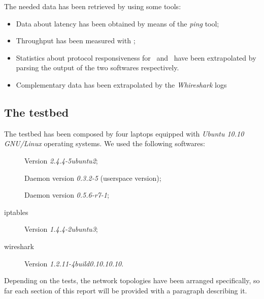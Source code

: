     The needed data has been retrieved by using some tools:
    \begin{itemize}
    \item   Data about latency has been obtained by means of the
            \emph{ping} tool;
    \item   Throughput has been measured with
            \netperf\cite{bib:NetPerf};
    \item   Statistics about protocol responsiveness for \batman\ and
            \olsr\ have been extrapolated by parsing the output of the
            two softwares respectively.
     \item Complementary data has been extrapolated by the
       \emph{Whireshark} logs
    \end{itemize}

\subsection{The testbed}
   The testbed has been composed by four laptops equipped with
    \emph{Ubuntu 10.10 GNU/Linux} operating systems. We used the following
    softwares:
    \begin{description}
    \item[\netperf] Version \emph{2.4.4-5ubuntu2};
    \item[\batman] Daemon version \emph{0.3.2-5} (userspace version);
    \item[\olsr] Daemon version \emph{0.5.6-r7-1};
    \item[iptables] Version \emph{1.4.4-2ubuntu3};
    \item[wireshark] Version \emph{1.2.11-4build0.10.10.10}.
    \end{description}

    Depending on the tests, the network topologies have been arranged
    specifically, so far each section of this report will be provided with
    a paragraph describing it.

